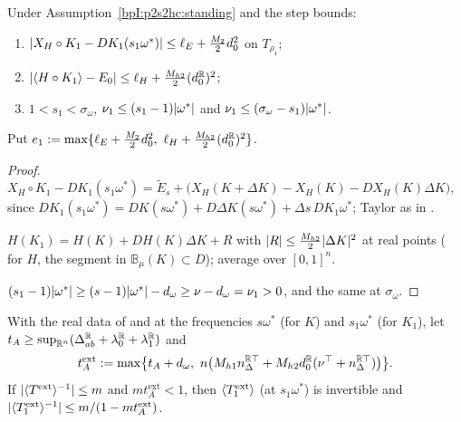 \begin{lemma}\label{bpI:p2s2hc:errors}
Under Assumption~\ref{bpI:p2s2hc:standing} and the step bounds:
\begin{enumerate}[label=(\alph*)]
\item $\lvert X_H\circ K_1-DK_1(s_1\omega^*)\rvert\le\ell_E+\frac{M_2}2d_0^2$ on $T_{\rho_1}$;
\item $\lvert \langle H\circ K_1\rangle-E_0\rvert\le\ell_H+\frac{M_{h2}}2(d_0^{\mathbb{R}})^2$;
\item $1<s_1<\sigma_\omega$, $\nu_1\le(s_1-1)\lvert \omega^*\rvert$ and $\nu_1\le(\sigma_\omega-s_1)\lvert \omega^*\rvert$.
\end{enumerate}
Put $e_1:=\max\{\ell_E+\frac{M_2}2d_0^2,\ \ell_H+\frac{M_{h2}}2(d_0^\R)^2\}$.
\end{lemma}

\begin{proof}
\label{stepI:p2s2hc:er}
$X_H\circ K_1-DK_1(s_1\omega^*)=\tilde E_s+\bigl(X_H(K+\Delta K)-X_H(K)-DX_H(K)\Delta K\bigr)$, since $DK_1(s_1\omega^*)=DK(s\omega^*)+D\Delta K(s\omega^*)+\Delta s\,DK_1\omega^*$;
Taylor as in .

\label{stepI:p2s2hc:en}
$H(K_1)=H(K)+DH(K)\Delta K+R$ with $\lvert R\rvert\le\frac{M_{h2}}2\lvert \Delta K\rvert^2$ at real points ( for $H$, the segment in $\mathbb B_\mu(K)\subset D$); average over
$[0,1]^n$.

\label{stepI:p2s2hc:ray}
$(s_1-1)\lvert \omega^*\rvert\ge(s-1)\lvert \omega^*\rvert-d_\omega\ge\nu-d_\omega=\nu_1>0$, and the same at $\sigma_\omega$.
\end{proof}

\begin{lemma}\label{bpI:p2s2hc:torsion}
With the real data of  and  at the frequencies $s\omega^*$ (for $K$) and $s_1\omega^*$ (for $K_1$), let
$t_A\ge\sup_{\mathbb{R}^n}(\Delta^{\mathbb{R}}_{ab}+\lambda_0^{\mathbb{R}}+\lambda_1^{\mathbb{R}})$ and
\[
t_A^{\mathrm{ext}}:=\max\bigl\{t_A+d_\omega,\ n\bigl(M_{h1}n_\Delta^{\R\top}+M_{h2}d_0^\R(\nu^\top+n_\Delta^{\R\top})\bigr)\bigr\}.
\]
If $\lvert \langle T^{\mathrm{ext}}\rangle^{-1}\rvert\le m$ and $mt_A^{\mathrm{ext}}<1$, then $\langle T_1^{\mathrm{ext}}\rangle$ (at $s_1\omega^*$) is invertible and $\lvert \langle T_1^{\mathrm{ext}}\rangle^{-1}\rvert\le m/(1-mt_A^{\mathrm{ext}})$.
\end{lemma}

